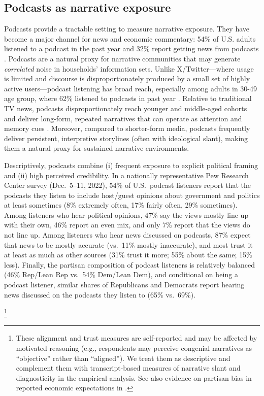 \documentclass[12pt]{article}
\begin{document}
\subsection{Podcasts as narrative exposure}
Podcasts provide a tractable setting to measure narrative exposure. They have become a major channel for news and economic commentary: 54\% of U.S. adults listened to a podcast in the past year and 32\% report getting news from podcasts \citep{pew_podcasts_news_fact_sheet_2025}.
Podcasts are a natural proxy for narrative communities that may generate \emph{correlated} noise in households' information sets. Unlike X/Twitter—where usage is limited and discourse is disproportionately produced by a small set of highly active users—podcast listening has broad reach, especially among adults in 30-49 age group, where 62\% listened to podcasts in past year \citep{pew_podcasts_news_fact_sheet_2025}.
Relative to traditional TV news, podcasts disproportionately reach younger and middle-aged cohorts and deliver long-form, repeated narratives that can operate as attention and memory cues \citep{BordaloGennaioliShleifer2020MemoryAttentionChoice}.
Moreover, compared to shorter-form media, podcasts frequently deliver persistent, interpretive storylines (often with ideological slant), making them a natural proxy for sustained narrative environments.

Descriptively, podcasts combine (i) frequent exposure to explicit political framing and (ii) high perceived credibility. In a nationally representative Pew Research Center survey (Dec.\ 5--11, 2022), 54\% of U.S.\ podcast listeners report that the podcasts they listen to include host/guest opinions about government and politics at least sometimes (8\% extremely often, 17\% fairly often, 29\% sometimes). Among listeners who hear political opinions, 47\% say the views mostly line up with their own, 46\% report an even mix, and only 7\% report that the views do not line up. Among listeners who hear news discussed on podcasts, 87\% expect that news to be mostly accurate (vs.\ 11\% mostly inaccurate), and most trust it at least as much as other sources (31\% trust it more; 55\% about the same; 15\% less). Finally, the partisan composition of podcast listeners is relatively balanced (46\% Rep/Lean Rep vs.\ 54\% Dem/Lean Dem), and conditional on being a podcast listener, similar shares of Republicans and Democrats report hearing news discussed on the podcasts they listen to (65\% vs.\ 69\%). \citep{pew_podcasts_news_fact_sheet_2025}

\footnote{These alignment and trust measures are self-reported and may be affected by motivated reasoning (e.g., respondents may perceive congenial narratives as ``objective'' rather than ``aligned''). We treat them as descriptive and complement them with transcript-based measures of narrative slant and diagnosticity in the empirical analysis. See also evidence on partisan bias in reported economic expectations in \citet{miansufi2023}.}
\end{document}
